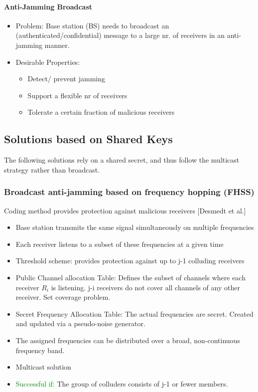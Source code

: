\paragraph{Anti-Jamming Broadcast}
\begin{itemize}
    \item Problem: Base station (BS) needs to broadcast an (authenticated/confidential) message to a large nr. of receivers in an anti-jamming manner.
    \item Desirable Properties: 
    \begin{itemize}
        \item Detect/ prevent jamming
        \item Support a flexible nr of receivers
        \item Tolerate a certain fraction of malicious receivers
    \end{itemize}
\end{itemize}

\subsection{Solutions based on Shared Keys}
The following solutions rely on a shared secret, and thus follow the multicast strategy rather than broadcast.

\subsubsection{Broadcast anti-jamming based on frequency hopping (FHSS)}
Coding method provides protection against malicious receivers [Desmedt et al.]
\begin{itemize}
    \item Base station transmits the same signal simultaneously on multiple frequencies
    \item Each receiver listens to a subset of these frequencies at a given time
    \item Threshold scheme: provides protection against up to j-1 colluding receivers
    \item Public Channel allocation Table: Defines the subset of channels where each receiver $R_i$ is listening. j-i receivers do not cover all channels of any other receiver. Set coverage problem.
    \item Secret Frequency Allocation Table: The actual frequencies are secret. Created and updated via a pseudo-noise generator.
    \item The assigned frequencies can be distributed over a broad, non-continuous frequency band.
    \item Multicast solution 
    \item \textcolor{green}{Successful if:} The group of colluders consists of j-1 or fewer members.
\end{itemize}

